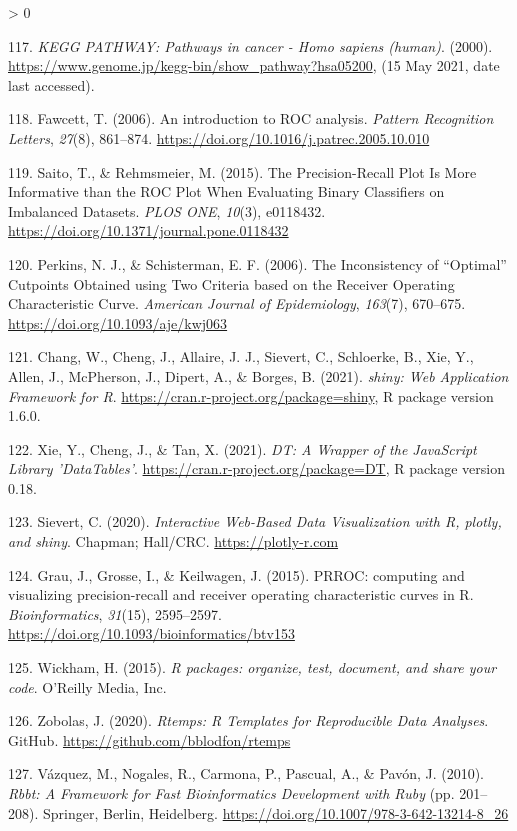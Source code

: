 \documentclass[
  12pt,
]{book}
\newlength{\cslhangindent}
\newenvironment{CSLReferences}[2] %
 {%
  \setlength{\parindent}{0pt}
  \ifodd #1 \everypar{\setlength{\hangindent}{\cslhangindent}}\ignorespaces\fi
  \ifnum #2 > 0
  \setlength{\parskip}{#2\baselineskip}
  \fi
 }%
 {}
\begin{document}
\begin{CSLReferences}{1}{0}
\leavevmode\hypertarget{ref-kegg-cancer}{}%
117. \emph{{KEGG PATHWAY: Pathways in cancer - Homo sapiens (human)}}. (2000). \url{https://www.genome.jp/kegg-bin/show_pathway?hsa05200}, (15 May 2021, date last accessed).

\leavevmode\hypertarget{ref-Fawcett2006}{}%
118. Fawcett, T. (2006). {An introduction to ROC analysis}. \emph{Pattern Recognition Letters}, \emph{27}(8), 861--874. \url{https://doi.org/10.1016/j.patrec.2005.10.010}

\leavevmode\hypertarget{ref-Saito2015}{}%
119. Saito, T., \& Rehmsmeier, M. (2015). {The Precision-Recall Plot Is More Informative than the ROC Plot When Evaluating Binary Classifiers on Imbalanced Datasets}. \emph{PLOS ONE}, \emph{10}(3), e0118432. \url{https://doi.org/10.1371/journal.pone.0118432}

\leavevmode\hypertarget{ref-Perkins2006}{}%
120. Perkins, N. J., \& Schisterman, E. F. (2006). {The Inconsistency of {``Optimal''} Cutpoints Obtained using Two Criteria based on the Receiver Operating Characteristic Curve}. \emph{American Journal of Epidemiology}, \emph{163}(7), 670--675. \url{https://doi.org/10.1093/aje/kwj063}

\leavevmode\hypertarget{ref-Chang2021}{}%
121. Chang, W., Cheng, J., Allaire, J. J., Sievert, C., Schloerke, B., Xie, Y., Allen, J., McPherson, J., Dipert, A., \& Borges, B. (2021). \emph{{shiny: Web Application Framework for R}}. \url{https://cran.r-project.org/package=shiny}, R package version 1.6.0.

\leavevmode\hypertarget{ref-Xie2021}{}%
122. Xie, Y., Cheng, J., \& Tan, X. (2021). \emph{{DT: A Wrapper of the JavaScript Library 'DataTables'}}. \url{https://cran.r-project.org/package=DT}, R package version 0.18.

\leavevmode\hypertarget{ref-Sievert2020}{}%
123. Sievert, C. (2020). \emph{{Interactive Web-Based Data Visualization with R, plotly, and shiny}}. Chapman; Hall/CRC. \url{https://plotly-r.com}

\leavevmode\hypertarget{ref-Grau2015}{}%
124. Grau, J., Grosse, I., \& Keilwagen, J. (2015). {PRROC: computing and visualizing precision-recall and receiver operating characteristic curves in R}. \emph{Bioinformatics}, \emph{31}(15), 2595--2597. \url{https://doi.org/10.1093/bioinformatics/btv153}

\leavevmode\hypertarget{ref-Wickham2015}{}%
125. Wickham, H. (2015). \emph{{R packages: organize, test, document, and share your code}}. O'Reilly Media, Inc.

\leavevmode\hypertarget{ref-rtemps}{}%
126. Zobolas, J. (2020). \emph{{Rtemps: R Templates for Reproducible Data Analyses}}. GitHub. \url{https://github.com/bblodfon/rtemps}

\leavevmode\hypertarget{ref-Vazquez2010}{}%
127. Vázquez, M., Nogales, R., Carmona, P., Pascual, A., \& Pavón, J. (2010). \emph{{Rbbt: A Framework for Fast Bioinformatics Development with Ruby}} (pp. 201--208). Springer, Berlin, Heidelberg. \url{https://doi.org/10.1007/978-3-642-13214-8_26}

\end{CSLReferences}
\end{document}
